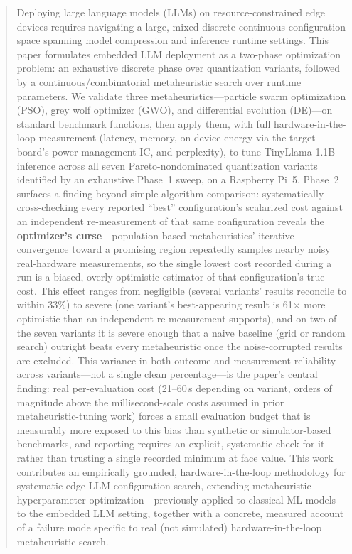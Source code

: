\documentclass[journal]{IEEEtran}
\begin{document}
\begin{abstract}
Deploying large language models (LLMs) on resource-constrained edge devices requires navigating a large, mixed discrete-continuous configuration space spanning model compression and inference runtime settings. This paper formulates embedded LLM deployment as a two-phase optimization problem: an exhaustive discrete phase over quantization variants, followed by a continuous/combinatorial metaheuristic search over runtime parameters. We validate three metaheuristics---particle swarm optimization (PSO), grey wolf optimizer (GWO), and differential evolution (DE)---on standard benchmark functions, then apply them, with full hardware-in-the-loop measurement (latency, memory, on-device energy via the target board's power-management IC, and perplexity), to tune TinyLlama-1.1B inference across all seven Pareto-nondominated quantization variants identified by an exhaustive Phase~1 sweep, on a Raspberry Pi~5. Phase~2 surfaces a finding beyond simple algorithm comparison: systematically cross-checking every reported ``best'' configuration's scalarized cost against an independent re-measurement of that same configuration reveals the \textbf{optimizer's curse}---population-based metaheuristics' iterative convergence toward a promising region repeatedly samples nearby noisy real-hardware measurements, so the single lowest cost recorded during a run is a biased, overly optimistic estimator of that configuration's true cost. This effect ranges from negligible (several variants' results reconcile to within 33\%) to severe (one variant's best-appearing result is 61$\times$ more optimistic than an independent re-measurement supports), and on two of the seven variants it is severe enough that a naive baseline (grid or random search) outright beats every metaheuristic once the noise-corrupted results are excluded. This variance in both outcome and measurement reliability across variants---not a single clean percentage---is the paper's central finding: real per-evaluation cost (21--60\,s depending on variant, orders of magnitude above the millisecond-scale costs assumed in prior metaheuristic-tuning work) forces a small evaluation budget that is measurably more exposed to this bias than synthetic or simulator-based benchmarks, and reporting requires an explicit, systematic check for it rather than trusting a single recorded minimum at face value. This work contributes an empirically grounded, hardware-in-the-loop methodology for systematic edge LLM configuration search, extending metaheuristic hyperparameter optimization---previously applied to classical ML models---to the embedded LLM setting, together with a concrete, measured account of a failure mode specific to real (not simulated) hardware-in-the-loop metaheuristic search.
\end{abstract}
\end{document}
